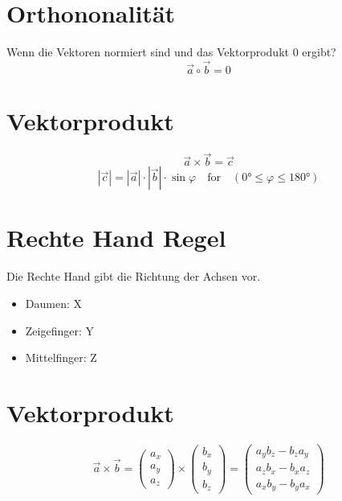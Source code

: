 \section{Orthononalität}
	Wenn die Vektoren normiert sind und das Vektorprodukt 0 ergibt?		
		\begin{equation}
			\vec{a} \circ \vec{b} = 0
		\end{equation}

\section{Vektorprodukt}
	\begin{equation}
		\vec{a} \times \vec{b} = \vec{c}
	\end{equation}
	\begin{equation}
		|\vec{c}| = |\vec{a}| \cdot |\vec{b}| \cdot \sin\varphi 
		\quad \textrm{for} \quad 
		(\ang{0} \leq \varphi \leq \ang{180})
	\end{equation}


\section{Rechte Hand Regel}
	Die Rechte Hand gibt die Richtung der Achsen vor.
	\begin{itemize}
		\item Daumen: X
		\item Zeigefinger: Y
		\item Mittelfinger: Z
	\end{itemize}


\section{Vektorprodukt}

	\begin{equation}
		\vec{a} \times \vec{b} = 
		\left(
		\begin{array}{c}
			a_{x} \\
			a_{y} \\
			a_{z}
		\end{array}
		\right)
		\times
		\left(
		\begin{array}{c}
			b_{x} \\
			b_{y} \\
			b_{z}				
		\end{array}
		\right)
		= 
		\left(
		\begin{array}{c}
			a_{y}b_{z} - b_{z}a_{y} \\
			a_{z}b_{x} - b_{x}a_{z} \\
			a_{x}b_{y} - b_{y}a_{x}  
		\end{array}
		\right)				
	\end{equation}


